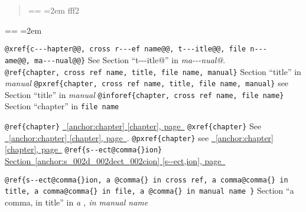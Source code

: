 \documentclass{book}
\makeatletter
\newenvironment{GNUTexinfopreformatted}{%
  \par\obeylines\obeyspaces\frenchspacing
  \parskip=\z@\parindent=\z@}{}
\makeatother
\begin{document}
%
\begin{quote}
\unskip{\parskip=0pt\noindent}%
\begin{GNUTexinfopreformatted}
\leftskip=2em\relax\ttfamily%
fff2
\end{GNUTexinfopreformatted}
\end{quote}
\begin{GNUTexinfopreformatted}
\leftskip=2em\relax\ttfamily%


\texttt{@xref\{c{-}{-}{-}hapter@@,\ cross r{-}{-}{-}ef name@@,\ t{-}{-}{-}itle@@,\ file n{-}{-}{-}ame@@,\ ma{-}{-}{-}nual@@\}} See Section ``t{-}{-}{-}itle@'' in \textsl{ma{-}{-}{-}nual@}.
\texttt{@ref\{chapter,\ cross ref name,\ title,\ file name,\ manual\}} Section ``title'' in \textsl{manual}
\texttt{@pxref\{chapter,\ cross ref name,\ title,\ file name,\ manual\}} see Section ``title'' in \textsl{manual}
\texttt{@inforef\{chapter,\ cross ref name,\ file name\}} Section ``chapter'' in \texttt{file name}

\texttt{@ref\{chapter\}} \hyperref[anchor:chapter]{\chaptername~\ref*{anchor:chapter} [chapter], page~\pageref*{anchor:chapter}}
\texttt{@xref\{chapter\}} See \hyperref[anchor:chapter]{\chaptername~\ref*{anchor:chapter} [chapter], page~\pageref*{anchor:chapter}}.
\texttt{@pxref\{chapter\}} see \hyperref[anchor:chapter]{\chaptername~\ref*{anchor:chapter} [chapter], page~\pageref*{anchor:chapter}}
\texttt{@ref\{s{-}{-}ect@comma\{\}ion\}} \hyperref[anchor:s_002d_002dect_002cion]{Section~\ref*{anchor:s_002d_002dect_002cion} [s{-}{-}ect,ion], page~\pageref*{anchor:s_002d_002dect_002cion}}

\texttt{@ref\{s{-}{-}ect@comma\{\}ion,\ a @comma\{\} in cross
ref,\ a comma@comma\{\} in title,\ a comma@comma\{\} in file,\ a @comma\{\} in manual name \}}
Section ``a comma, in title'' in \textsl{a , in manual name}


\end{GNUTexinfopreformatted}
\end{document}
